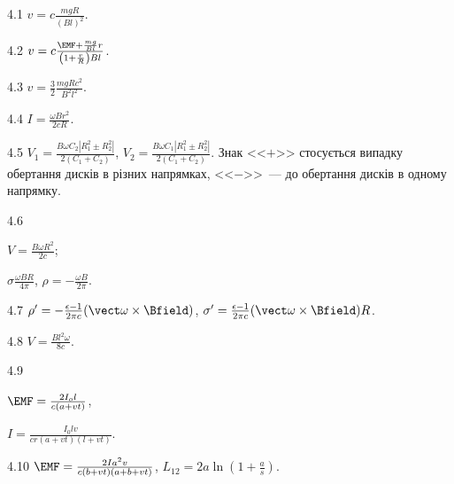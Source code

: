 \protect \section *{}
\begin{Solution}{4.{1}}
	$v = c\frac{mgR}{(Bl)^2}$.
\end{Solution}
\begin{Solution}{4.{2}}
	$v = c \frac{\EMF + \frac{mg}{Bl}r}{\left( 1 +  \frac{r}{R}\right)Bl}$.
\end{Solution}
\begin{Solution}{4.{3}}
	$v = \frac32 \frac{mgRc^2}{B^2l^2}$.
\end{Solution}
\begin{Solution}{4.{4}}
	$I = \frac{\omega B r^2}{2cR}$.
\end{Solution}
\begin{Solution}{4.{5}}
	$V_1  = \frac{B\omega C_2 \left| R_1^2 \pm R_2^2 \right| }{2(C_1 + C_2)}$, $V_2  = \frac{B\omega C_1 \left| R_1^2 \pm R_2^2 \right| }{2(C_1 + C_2)}$. Знак <<$+$>> стосується випадку обертання дисків
	в різних напрямках, <<$-$>>~--- до обертання дисків в одному напрямку.
\end{Solution}
\begin{Solution}{4.{6}}
	\begin{enumerate*}[label=\alph*)]
		\item $V = \frac{B\omega R^2}{2c}$;
		\item $\sigma \frac{\omega B R}{4\pi}$, $\rho = -\frac{\omega B}{2\pi}$.
	\end{enumerate*}
\end{Solution}
\begin{Solution}{4.{7}}
		$\rho' = -\frac{\epsilon - 1}{2\pi c} (\vect\omega\times\Bfield)$, $\sigma' = \frac{\epsilon - 1}{2\pi c} (\vect\omega\times\Bfield)R$.
\end{Solution}
\begin{Solution}{4.{8}}
	$V = \frac{Bl^2\omega}{8c}$.
\end{Solution}
\begin{Solution}{4.{9}}
	\begin{enumerate*}[label=\alph*)]
		\item $\EMF = \frac{2I_ol}{c(a+vt)}$,
		\item $I = \frac{I_0 l v}{cr(a+vt)(l+vt)}$.
	\end{enumerate*}
\end{Solution}
\begin{Solution}{4.{10}}
	$\EMF = \frac{2Ia^2v}{c(b+vt)(a+ b  +vt)}$, $L_{12} = 2a\ln \left( 1+ \frac{a}{s}\right) $.
\end{Solution}

